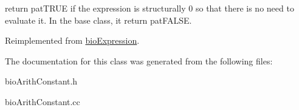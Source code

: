 return pat\+T\+R\+UE if the expression is structurally 0 so that there is no need to evaluate it. In the base class, it return pat\+F\+A\+L\+SE. 

Reimplemented from \hyperlink{classbio_expression_a264c6d78671610ada8261d698e4c4c42}{bio\+Expression}.



The documentation for this class was generated from the following files\+:\begin{DoxyCompactItemize}
\item 
bio\+Arith\+Constant.\+h\item 
bio\+Arith\+Constant.\+cc\end{DoxyCompactItemize}
